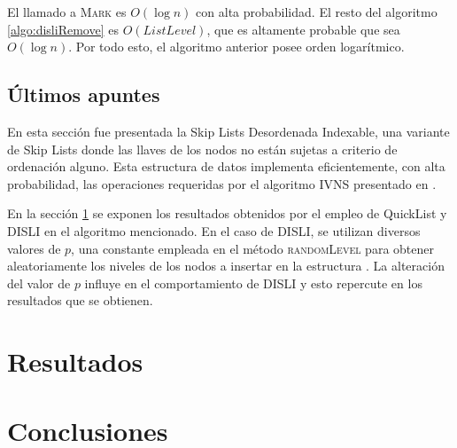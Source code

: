 \documentclass[a4paper,10pt,twocolumn]{article}
\begin{document}
  El llamado a \textsc{Mark} es $ O(\log n) $ con alta probabilidad. El resto del algoritmo \ref{algo:disliRemove} es $ O(ListLevel) $, que es altamente probable que sea $ O(\log n) $. Por todo esto, el algoritmo anterior posee orden logarítmico.
  
\subsection{Últimos apuntes}\label{subsec:disliSummary}
  En esta sección fue presentada la Skip Lists Desordenada Indexable, una variante de Skip Lists donde las llaves de los nodos no están sujetas a criterio de ordenación alguno. Esta estructura de datos implementa eficientemente, con alta probabilidad, las operaciones requeridas por el algoritmo IVNS presentado en \cite{Andy}.
  
  En la sección \ref{sec:resul} se exponen los resultados obtenidos por el empleo de QuickList y DISLI en el algoritmo mencionado. En el caso de DISLI, se utilizan diversos valores de $ p $, una constante empleada en el método \textsc{randomLevel} para obtener aleatoriamente los niveles de los nodos a insertar en la estructura \cite{Pugh}. La alteración del valor de $ p $ influye en el comportamiento de DISLI y esto repercute en los resultados que se obtienen.
  

\section{Resultados}\label{sec:resul}

\section{Conclusiones}\label{sec:conc}
\end{document}
